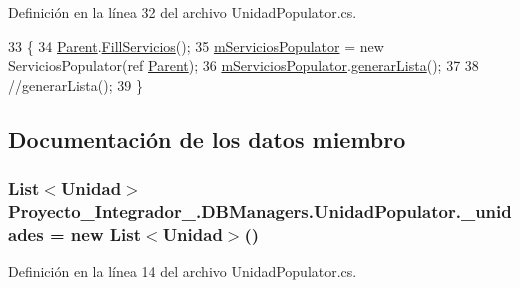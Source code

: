 Definición en la línea 32 del archivo Unidad\-Populator.\-cs.


\begin{DoxyCode}
33             \{
34                 \hyperlink{class_proyecto___integrador__3_1_1_d_b_managers_1_1_unidad_populator_af564e36862498316aa1c5483c7cd8bc1}{Parent}.\hyperlink{class_proyecto___integrador__3_1_1_d_b_managers_af60e768a1ec8417d606d3e718d6a22d5}{FillServicios}();
35                 \hyperlink{class_proyecto___integrador__3_1_1_d_b_managers_1_1_unidad_populator_a415439e84a77c50a90a5796f8f0e646d}{mServiciosPopulator} = \textcolor{keyword}{new} ServiciosPopulator(ref 
      \hyperlink{class_proyecto___integrador__3_1_1_d_b_managers_1_1_unidad_populator_af564e36862498316aa1c5483c7cd8bc1}{Parent});
36                 \hyperlink{class_proyecto___integrador__3_1_1_d_b_managers_1_1_unidad_populator_a415439e84a77c50a90a5796f8f0e646d}{mServiciosPopulator}.\hyperlink{class_proyecto___integrador__3_1_1_d_b_managers_1_1_servicios_populator_a9ac6be7f5ecdbdadd850b3519a985f75}{generarLista}();
37 
38                 \textcolor{comment}{//generarLista();}
39             \}
\end{DoxyCode}


\subsection{Documentación de los datos miembro}
\hypertarget{class_proyecto___integrador__3_1_1_d_b_managers_1_1_unidad_populator_a0704f72a36a446b2f4643226b9eb5917}{
\subsubsection[{\-\_\-unidades}]{\setlength{\rightskip}{0pt plus 5cm}List$<${\bf Unidad}$>$ Proyecto\-\_\-\-Integrador\-\_.\-D\-B\-Managers.\-Unidad\-Populator.\-\_\-unidades = new List$<${\bf Unidad}$>$()\hspace{0.3cm}{\ttfamily [private]}}}\label{class_proyecto___integrador__3_1_1_d_b_managers_1_1_unidad_populator_a0704f72a36a446b2f4643226b9eb5917}


Definición en la línea 14 del archivo Unidad\-Populator.\-cs.

